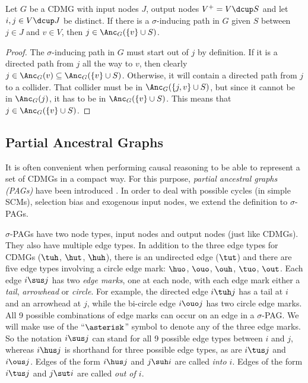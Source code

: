\begin{Lem}\label{lem:inducing_path_out_of_input}
  Let $G$ be a CDMG with input nodes $J$, output nodes $V^+ = V \dcup S$ and let $i,j \in V \dcup J$ be distinct.
  If there is a $\sigma$-inducing path in $G$ given $S$ between $j \in J$ and $v \in V$, then $j \in \Anc_G(\{v\} \cup S)$. 
\end{Lem}
\begin{proof}
  The $\sigma$-inducing path in $G$ must start out of $j$ by definition. 
  If it is a directed path from $j$ all the way to $v$, then clearly $j \in \Anc_G(v) \subseteq \Anc_G(\{v\} \cup S)$.
  Otherwise, it will contain a directed path from $j$ to a collider.
  That collider must be in $\Anc_G(\{j,v\} \cup S)$, but since it cannot be in $\Anc_G(j)$, it has to be in $\Anc_G(\{v\} \cup S)$.
  This means that $j \in \Anc_G(\{v\} \cup S)$.
\end{proof}

\subsection{Partial Ancestral Graphs}

It is often convenient when performing causal reasoning to be able to represent a set of CDMGs in a compact way. 
For this purpose, \emph{partial ancestral graphs (PAGs)} have been introduced \cite{SMR1999,Zhang2006}.
In order to deal with possible cycles (in simple SCMs), selection bias and exogenous input nodes, we extend the definition to $\sigma$-PAGs.

$\sigma$-PAGs have two node types, input nodes and output nodes (just like CDMGs).
They also have multiple edge types. In addition to the three edge types for CDMGs
($\tuh$, $\hut$, $\huh$), there is an undirected edge ($\tut$) and there are five
edge types involving a circle edge mark: $\huo$, $\ouo$, $\ouh$, $\tuo$, $\out$. 
Each edge $i \sus j$ has two \emph{edge marks}, one at each node, with each edge mark
either a \emph{tail}, \emph{arrowhead} or \emph{circle}. For example, the directed edge $i \tuh j$ has a 
tail at $i$ and an arrowhead at $j$, while the bi-circle edge $i \ouo j$ has two circle edge marks.
All 9 possible combinations of edge marks can occur on an edge in a $\sigma$-PAG. We will make use
of the ``$\asterisk$'' symbol to denote any of the three edge marks. So the notation $i \sus j$
can stand for all 9 possible edge types between $i$ and $j$, whereas $i \hus j$ is shorthand for three
possible edge types, as are $i \tus j$ and $i \ous j$.
Edges of the form $i \hus j$ and $j \suh i$ are called \emph{into $i$}. 
Edges of the form $i \tus j$ and $j \sut i$ are called \emph{out of $i$}.

